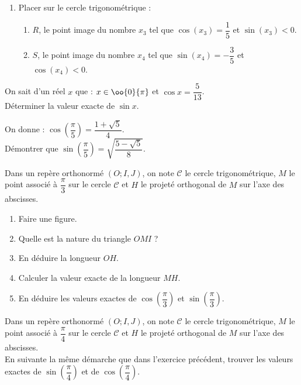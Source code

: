 \documentclass[11 pt, a4paper]{article}
\begin{document}
\begin{enumerate}[start=3]
	\item Placer sur le cercle trigonométrique :
	\begin{enumerate}
		\item $R$, le point image du nombre $x_3$ tel que $\cos(x_3)=\dfrac{1}{5}$ et $\sin(x_3) < 0$.
		\item $S$, le point image du nombre $x_4$ tel que $\sin(x_4)=-\dfrac{3}{5}$ et $\cos(x_4) < 0$.
	\end{enumerate}
\end{enumerate}

On sait d'un réel $x$ que : $x \in \oo{0}{\pi}$ et $\cos x = \dfrac{5}{13}$.\\
Déterminer la valeur exacte de $\sin x$.
		
On donne : $\cos(\dfrac{\pi}{5}) = \dfrac{1+\sqrt{5}}{4}$.\\
Démontrer que $\sin(\dfrac{\pi}{5}) = \sqrt{\dfrac{5-\sqrt{5}}{8}}$.

Dans un repère orthonormé $(O;I,J)$, on note $\mathscr{C}$ le cercle trigonométrique, $M$ le point associé à $\dfrac{\pi}{3}$ sur le cercle $\mathscr{C}$ et $H$ le projeté orthogonal de $M$ sur l'axe des abscisses.
\begin{enumerate}
	\item Faire une figure.
	\item Quelle est la nature du triangle $OMI$ ?
	\item En déduire la longueur $OH$.
	\item Calculer la valeur exacte de la longueur $MH$.
	\item En déduire les valeurs exactes de $\cos\left(\dfrac{\pi}{3}\right)$ et $\sin\left(\dfrac{\pi}{3}\right)$.
\end{enumerate}



Dans un repère orthonormé $(O;I,J)$, on note $\mathscr{C}$ le cercle trigonométrique, $M$ le point associé à $\dfrac{\pi}{4}$ sur le cercle $\mathscr{C}$ et $H$ le projeté orthogonal de $M$ sur l'axe des abscisses.\\
En suivante la même démarche que dans l'exercice précédent, trouver les valeurs exactes de $\sin\left(\dfrac{\pi}{4}\right)$ et de $\cos\left(\dfrac{\pi}{4}\right)$.
\end{document}
